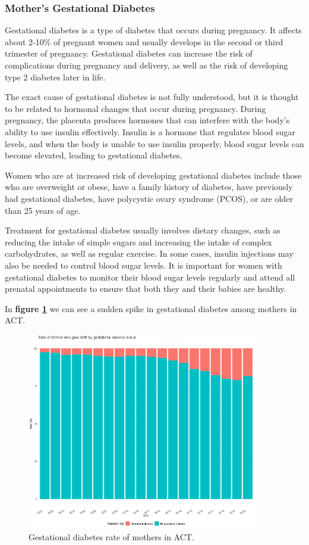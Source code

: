 \subsubsection{Mother's Gestational Diabetes}
Gestational diabetes is a type of diabetes that occurs during pregnancy. It affects about 2-10\% of pregnant women and usually develops in the second or third trimester of pregnancy. Gestational diabetes can increase the risk of complications during pregnancy and delivery, as well as the risk of developing type 2 diabetes later in life.

The exact cause of gestational diabetes is not fully understood, but it is thought to be related to hormonal changes that occur during pregnancy. During pregnancy, the placenta produces hormones that can interfere with the body's ability to use insulin effectively. Insulin is a hormone that regulates blood sugar levels, and when the body is unable to use insulin properly, blood sugar levels can become elevated, leading to gestational diabetes.

Women who are at increased risk of developing gestational diabetes include those who are overweight or obese, have a family history of diabetes, have previously had gestational diabetes, have polycystic ovary syndrome (PCOS), or are older than 25 years of age.

Treatment for gestational diabetes usually involves dietary changes, such as reducing the intake of simple sugars and increasing the intake of complex carbohydrates, as well as regular exercise. In some cases, insulin injections may also be needed to control blood sugar levels. It is important for women with gestational diabetes to monitor their blood sugar levels regularly and attend all prenatal appointments to ensure that both they and their babies are healthy.

In \textbf{figure \ref{fig:gest_diabetes}} we can see a sudden spike in gestational diabetes among mothers in ACT.

\begin{figure}
  \centering
  \includegraphics[width=0.90\textwidth]{subsections/baby_health/gestational_diabetes_rate.png}
  \caption{Gestational diabetes rate of mothers in ACT.}
  \label{fig:gest_diabetes}
\end{figure}